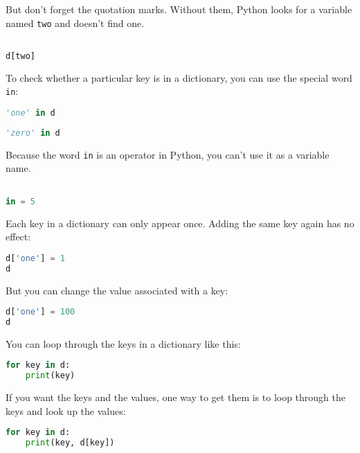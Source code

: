But don't forget the quotation marks. Without them, Python looks for a
variable named \passthrough{\lstinline!two!} and doesn't find one.

\begin{lstlisting}[language=Python,style=source]
%%expect NameError

d[two]
\end{lstlisting}

To check whether a particular key is in a dictionary, you can use the
special word \passthrough{\lstinline!in!}:

\begin{lstlisting}[language=Python,style=source]
'one' in d
\end{lstlisting}

\begin{lstlisting}[language=Python,style=source]
'zero' in d
\end{lstlisting}

Because the word \passthrough{\lstinline!in!} is an operator in Python,
you can't use it as a variable name.

\begin{lstlisting}[language=Python,style=source]
%%expect SyntaxError

in = 5
\end{lstlisting}

Each key in a dictionary can only appear once. Adding the same key again
has no effect:

\begin{lstlisting}[language=Python,style=source]
d['one'] = 1
d
\end{lstlisting}

But you can change the value associated with a key:

\begin{lstlisting}[language=Python,style=source]
d['one'] = 100
d
\end{lstlisting}

You can loop through the keys in a dictionary like this:

\begin{lstlisting}[language=Python,style=source]
for key in d:
    print(key)
\end{lstlisting}

If you want the keys and the values, one way to get them is to loop
through the keys and look up the values:

\begin{lstlisting}[language=Python,style=source]
for key in d:
    print(key, d[key])
\end{lstlisting}


